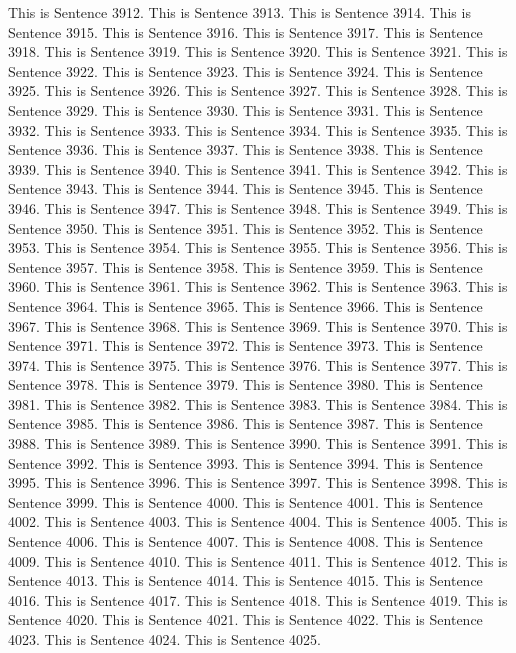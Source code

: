 \documentclass{article}
\begin{document}
This is Sentence 3912.
This is Sentence 3913.
This is Sentence 3914.
This is Sentence 3915.
This is Sentence 3916.
This is Sentence 3917.
This is Sentence 3918.
This is Sentence 3919.
This is Sentence 3920.
This is Sentence 3921.
This is Sentence 3922.
This is Sentence 3923.
This is Sentence 3924.
This is Sentence 3925.
This is Sentence 3926.
This is Sentence 3927.
This is Sentence 3928.
This is Sentence 3929.
This is Sentence 3930.
This is Sentence 3931.
This is Sentence 3932.
This is Sentence 3933.
This is Sentence 3934.
This is Sentence 3935.
This is Sentence 3936.
This is Sentence 3937.
This is Sentence 3938.
This is Sentence 3939.
This is Sentence 3940.
This is Sentence 3941.
This is Sentence 3942.
This is Sentence 3943.
This is Sentence 3944.
This is Sentence 3945.
This is Sentence 3946.
This is Sentence 3947.
This is Sentence 3948.
This is Sentence 3949.
This is Sentence 3950.
This is Sentence 3951.
This is Sentence 3952.
This is Sentence 3953.
This is Sentence 3954.
This is Sentence 3955.
This is Sentence 3956.
This is Sentence 3957.
This is Sentence 3958.
This is Sentence 3959.
This is Sentence 3960.
This is Sentence 3961.
This is Sentence 3962.
This is Sentence 3963.
This is Sentence 3964.
This is Sentence 3965.
This is Sentence 3966.
This is Sentence 3967.
This is Sentence 3968.
This is Sentence 3969.
This is Sentence 3970.
This is Sentence 3971.
This is Sentence 3972.
This is Sentence 3973.
This is Sentence 3974.
This is Sentence 3975.
This is Sentence 3976.
This is Sentence 3977.
This is Sentence 3978.
This is Sentence 3979.
This is Sentence 3980.
This is Sentence 3981.
This is Sentence 3982.
This is Sentence 3983.
This is Sentence 3984.
This is Sentence 3985.
This is Sentence 3986.
This is Sentence 3987.
This is Sentence 3988.
This is Sentence 3989.
This is Sentence 3990.
This is Sentence 3991.
This is Sentence 3992.
This is Sentence 3993.
This is Sentence 3994.
This is Sentence 3995.
This is Sentence 3996.
This is Sentence 3997.
This is Sentence 3998.
This is Sentence 3999.
This is Sentence 4000.
This is Sentence 4001.
This is Sentence 4002.
This is Sentence 4003.
This is Sentence 4004.
This is Sentence 4005.
This is Sentence 4006.
This is Sentence 4007.
This is Sentence 4008.
This is Sentence 4009.
This is Sentence 4010.
This is Sentence 4011.
This is Sentence 4012.
This is Sentence 4013.
This is Sentence 4014.
This is Sentence 4015.
This is Sentence 4016.
This is Sentence 4017.
This is Sentence 4018.
This is Sentence 4019.
This is Sentence 4020.
This is Sentence 4021.
This is Sentence 4022.
This is Sentence 4023.
This is Sentence 4024.
This is Sentence 4025.
\end{document}
